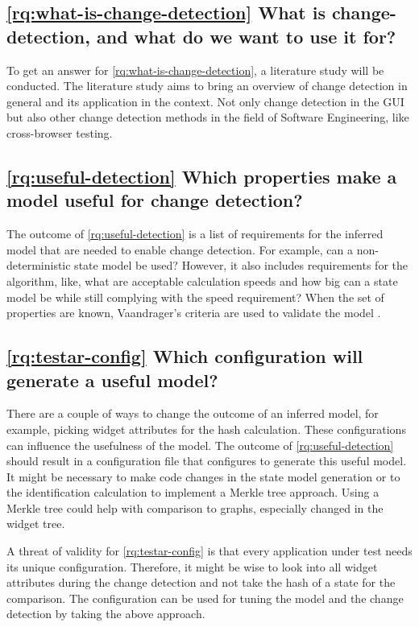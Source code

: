 \subsection{\ref{rq:what-is-change-detection} What is change-detection, and what do we want to use it for?}
To get an answer for \ref{rq:what-is-change-detection}, a literature study will be conducted. The literature study aims to bring an overview of change detection in general and its application in the \testar context. Not only change detection in the GUI but also other change detection methods in the field of Software Engineering, like cross-browser testing. 

\subsection{\ref{rq:useful-detection} Which properties make a model useful for change detection?}
The outcome of \ref{rq:useful-detection} is a list of requirements for the inferred model that are needed to enable change detection. For example, can a non-deterministic state model be used? However, it also includes requirements for the algorithm, like, what are acceptable calculation speeds and how big can a state model be while still complying with the speed requirement? When the set of properties are known, Vaandrager's criteria are used to validate the model \cite{vaandrager}.

\subsection{\ref{rq:testar-config} Which \testar configuration will generate a useful model?}
There are a couple of ways to change the outcome of an inferred model, for example, picking widget attributes for the hash calculation. These configurations can influence the usefulness of the model. The outcome of \ref{rq:useful-detection} should result in a \testar configuration file that configures \testar to generate this useful model. It might be necessary to make code changes in the state model generation or to the identification calculation to implement a Merkle tree approach. Using a Merkle tree could help with comparison to graphs, especially changed in the widget tree. 

A threat of validity for \ref{rq:testar-config} is that every application under test needs its unique configuration. Therefore, it might be wise to look into all widget attributes during the change detection and not take the hash of a state for the comparison. The configuration can be used for tuning the model and the change detection by taking the above approach.

